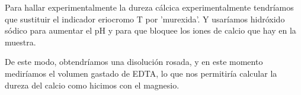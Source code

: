 \vspace{0.1cm}

\noindent Para hallar experimentalmente la dureza cálcica experimentalmente tendríamos que sustituir el indicador eriocromo T por 'murexida'. Y usaríamos hidróxido sódico para aumentar el pH y para que bloquee los iones de calcio que hay en la muestra.

\vspace{0.3cm}

\noindent De este modo, obtendríamos una disolución rosada, y en este momento mediríamos el volumen gastado de EDTA, lo que nos permitiría calcular la dureza del calcio como hicimos con el magnesio.







